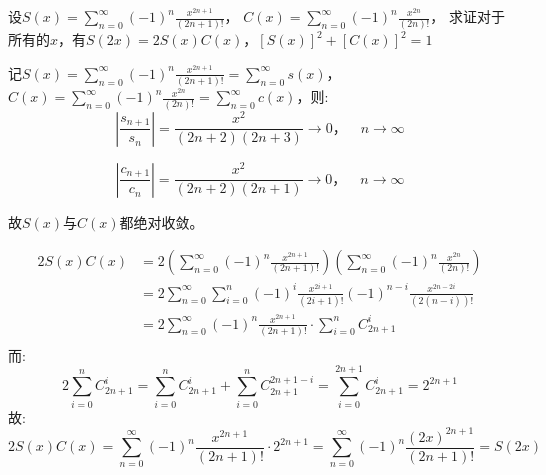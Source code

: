 \begin{problem}
    设\(S(x) = \sum_{n=0}^{\infty} (-1)^n \frac{x^{2n+1}}{(2n+1)!}\)，
    \(C(x) = \sum_{n=0}^{\infty} (-1)^n \frac{x^{2n}}{(2n)!}\)，
    求证对于所有的\(x\)，有\(S(2x)=2S(x)C(x)\)，\([S(x)]^2+[C(x)]^2=1\)
\end{problem}


\begin{solution}
    记\(S(x) = \sum_{n=0}^{\infty} (-1)^n \frac{x^{2n+1}}{(2n+1)!} =
    \sum_{n=0}^{\infty} s(x)\)，\(C(x) = \sum_{n=0}^{\infty} (-1)^n
    \frac{x^{2n}}{(2n)!} = \sum_{n=0}^{\infty} c(x)\)，则:
    \[
        \left\vert \frac{s_{n+1}}{s_{n}} \right\vert =
        \frac{x^2}{(2n+2)(2n+3)} \to 0，\quad n \to \infty
    \]

    \[
        \left\vert \frac{c_{n+1}}{c_{n}} \right\vert =
        \frac{x^2}{(2n+2)(2n+1)} \to 0，\quad n \to \infty
    \]

    故\(S(x)\)与\(C(x)\)都绝对收敛。

    \begin{align*}
        2S(x)C(x) & = 2\left( \sum_{n=0}^{\infty} (-1)^n
        \frac{x^{2n+1}}{(2n+1)!} \right)  \left(
            \sum_{n=0}^{\infty} (-1)^n
        \frac{x^{2n}}{(2n)!} \right)
        \\
        & = 2 \sum_{n=0}^{\infty} \sum_{i=0}^{n} (-1)^{i}
        \frac{x^{2i+1}}{(2i+1)!} (-1)^{n-i}
        \frac{x^{2n-2i}}{(2(n-i))!}           \\
        & = 2 \sum_{n=0}^{\infty} (-1)^n
        \frac{x^{2n+1}}{(2n+1)!} \cdot
        \sum_{i=0}^{n} C^{i}_{2n+1}
        \\
    \end{align*}
    而:
    \[
        2 \sum_{i=0}^{n} C^{i}_{2n+1} = \sum_{i=0}^{n} C^{i}_{2n+1} +
        \sum_{i=0}^{n} C^{2n+1-i}_{2n+1}  = \sum_{i=0}^{2n+1}
        C^{i}_{2n+1} = 2^{2n+1}
    \]
    故:
    \[
        2S(x)C(x) = \sum_{n=0}^{\infty} (-1)^n
        \frac{x^{2n+1}}{(2n+1)!}
        \cdot 2^{2n+1} = \sum_{n=0}^{\infty} (-1)^n
        \frac{(2x)^{2n+1}}{(2n+1)!} = S(2x)
    \]


\end{solution}
